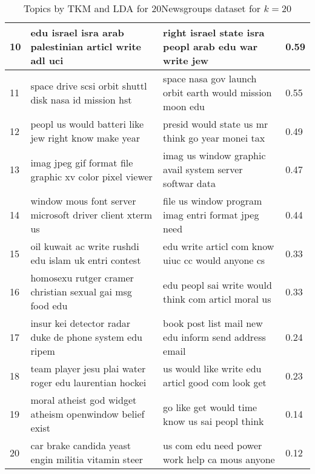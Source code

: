 \documentclass[twocolumn,10]{article}
\begin{document}
\begin{table*}[htp!]
\begin{tabular}{|l| l | l | l |}
			\scriptsize{10}&\scriptsize{edu israel isra arab palestinian articl write adl uci} & \scriptsize{right israel state isra peopl arab edu war write jew} & {0.59}\\ \hline 
			\scriptsize{11}&\scriptsize{space drive scsi orbit shuttl disk nasa id mission hst} & \scriptsize{space nasa gov launch orbit earth would mission moon edu} & {0.55}\\ \hline 
			\scriptsize{12}&\scriptsize{peopl us would batteri like jew right know make year} & \scriptsize{presid would state us mr think go year monei tax} & {0.49}\\ \hline 
			\scriptsize{13}&\scriptsize{imag jpeg gif format file graphic xv color pixel viewer} & \scriptsize{imag us window graphic avail system server softwar data} & {0.47}\\ \hline 
			\scriptsize{14}&\scriptsize{window mous font server microsoft driver client xterm us} & \scriptsize{file us window program imag entri format jpeg need} & {0.44}\\ \hline 
			\scriptsize{15}&\scriptsize{oil kuwait ac write rushdi edu islam uk entri contest} & \scriptsize{edu write articl com know uiuc cc would anyone cs} & {0.33}\\ \hline 
			\scriptsize{16}&\scriptsize{homosexu rutger cramer christian sexual gai msg food edu} & \scriptsize{edu peopl sai write would think com articl moral us} & {0.33}\\ \hline 
			\scriptsize{17}&\scriptsize{insur kei detector radar duke de phone system edu ripem} & \scriptsize{book post list mail new edu inform send address email} & {0.24}\\ \hline 
			\scriptsize{18}&\scriptsize{team player jesu plai water roger edu laurentian hockei} & \scriptsize{us would like write edu articl good com look get} & {0.23}\\ \hline 
			\scriptsize{19}&\scriptsize{moral atheist god widget atheism openwindow belief exist} & \scriptsize{go like get would time know us sai peopl think} & {0.14}\\ \hline 
			\scriptsize{20}&\scriptsize{car brake candida yeast engin militia vitamin steer} & \scriptsize{us com edu need power work help ca mous anyone } & {0.12}\\ \hline 
		\end{tabular}
		\caption{Topics by TKM and LDA for 20Newsgroups dataset for $k=20$ }\label{tab:qua}
		\vspace{-13pt}
	\end{table*}
	
\end{document}
